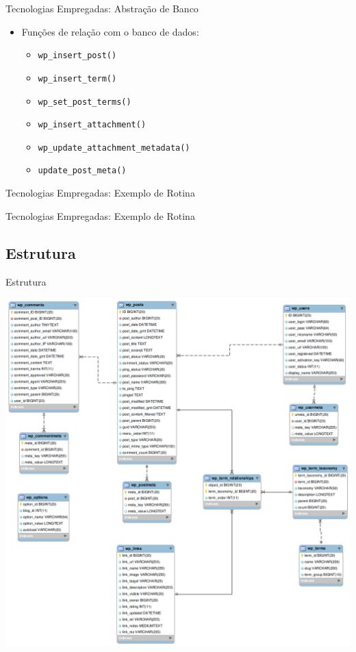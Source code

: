 \documentclass[handout]{beamer}
\begin{document}
\begin{frame}{Tecnologias Empregadas: Abstração de Banco}
    \begin{itemize}
    \pause \item Funções de relação com o banco de dados:
    \begin{itemize}
      \pause \item \texttt{wp\_insert\_post()}
      \pause \item \texttt{wp\_insert\_term()}
      \pause \item \texttt{wp\_set\_post\_terms()}
      \pause \item \texttt{wp\_insert\_attachment()}
      \pause \item \texttt{wp\_update\_attachment\_metadata()}
      \pause \item \texttt{update\_post\_meta()}
    \end{itemize}
  \end{itemize}
\end{frame}

\begin{frame}{Tecnologias Empregadas: Exemplo de Rotina}
  
\end{frame}

\begin{frame}{Tecnologias Empregadas: Exemplo de Rotina}
  
\end{frame}

\subsection{Estrutura}

\begin{frame}{Estrutura}
  \begin{center}
    \pause \includegraphics[height=0.8\textheight]{./img/wp-tables.png}
  \end{center}
\end{frame}
\end{document}
